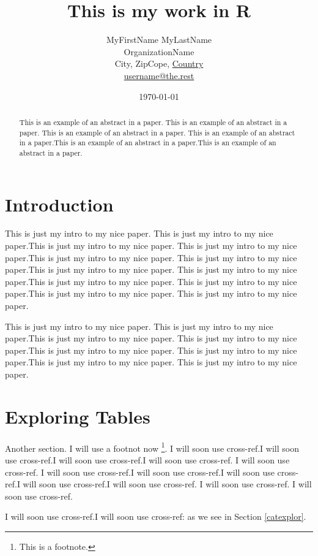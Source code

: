 \documentclass[a4paper, 12pt]{article}
\title{This is my work in R}
\author{ MyFirstName MyLastName\\OrganizationName\\
         City, ZipCope, \underline{Country}\\
        \url{username@the.rest}}
\date{\today}  %
\begin{document}

\maketitle 
\begin{abstract}
This is an example of an abstract in a paper. This is an example of an abstract in a paper. This is an example of an abstract in a paper. This is an example of an abstract in a paper.This is an example of an abstract in a paper.This is an example of an abstract in a paper.
\end{abstract}


\section*{Introduction} %

This is just my intro to my nice paper. This is just my intro to my nice paper.This is just my intro to my nice paper. This is just my intro to my nice paper.This is just my intro to my nice paper. This is just my intro to my nice paper.This is just my intro to my nice paper. This is just my intro to my nice paper.This is just my intro to my nice paper. This is just my intro to my nice paper.This is just my intro to my nice paper. This is just my intro to my nice paper.

This is just my intro to my nice paper. This is just my intro to my nice paper.This is just my intro to my nice paper. This is just my intro to my nice paper.This is just my intro to my nice paper. This is just my intro to my nice paper.This is just my intro to my nice paper. This is just my intro to my nice paper.


\section{Exploring Tables}\label{explo-tables} %

Another section. I will use a footnot now \footnote{This is a footnote.}. I will soon use cross-ref.I will soon use cross-ref.I will soon use cross-ref.I will soon use cross-ref. I will soon use cross-ref. I will soon use cross-ref.I will soon use cross-ref.I will soon use cross-ref.I will soon use cross-ref.I will soon use cross-ref. I will soon use cross-ref. I will soon use cross-ref.

I will soon use cross-ref.I will soon use cross-ref: as we see in Section \ref{catexplor}.
\end{document}
